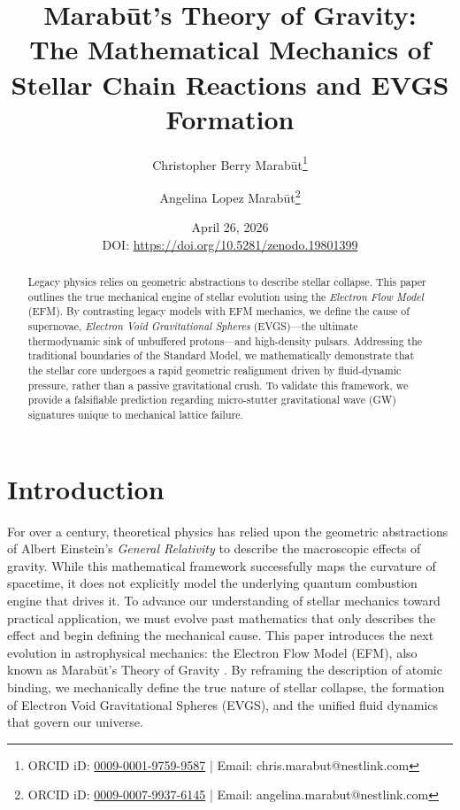 \documentclass[11pt, a4paper]{article}
\title{\textbf{Marab\={u}t's Theory of Gravity: \\ The Mathematical Mechanics of \\ Stellar Chain Reactions and EVGS Formation}}
\author[1]{Christopher Berry Marab\={u}t\thanks{ORCID iD: \href{https://orcid.org/0009-0001-9759-9587}{0009-0001-9759-9587} | Email: chris.marabut@nestlink.com}}
\author[1]{Angelina Lopez Marab\={u}t\thanks{ORCID iD: \href{https://orcid.org/0009-0007-9937-6145}{0009-0007-9937-6145} | Email: angelina.marabut@nestlink.com}}
\affil[1]{Independent Researchers}
\date{April 26, 2026 \\ \small{DOI: \url{https://doi.org/10.5281/zenodo.19801399}}}
\begin{document}

\maketitle

\begin{abstract}
  Legacy physics relies on geometric abstractions to describe stellar collapse. This paper outlines the true mechanical engine of stellar evolution using the \textit{Electron Flow Model} (EFM). By contrasting legacy models with EFM mechanics, we define the cause of supernovae, \textit{Electron Void Gravitational Spheres} (EVGS)---the ultimate thermodynamic sink of unbuffered protons---and high-density pulsars. Addressing the traditional boundaries of the Standard Model, we mathematically demonstrate that the stellar core undergoes a rapid geometric realignment driven by fluid-dynamic pressure, rather than a passive gravitational crush. To validate this framework, we provide a falsifiable prediction regarding micro-stutter gravitational wave (GW) signatures unique to mechanical lattice failure.
\end{abstract}

\section{Introduction}
  For over a century, theoretical physics has relied upon the geometric abstractions of Albert Einstein's \textit{General Relativity} to describe the macroscopic effects of gravity. While this mathematical framework successfully maps the curvature of spacetime, it does not explicitly model the underlying quantum combustion engine that drives it. To advance our understanding of stellar mechanics toward practical application, we must evolve past mathematics that only describes the effect and begin defining the mechanical cause. This paper introduces the next evolution in astrophysical mechanics: the Electron Flow Model (EFM), also known as Marab\={u}t's Theory of Gravity \cite{marabut2026}. By reframing the description of atomic binding, we mechanically define the true nature of stellar collapse, the formation of Electron Void Gravitational Spheres (EVGS), and the unified fluid dynamics that govern our universe.
\end{document}
